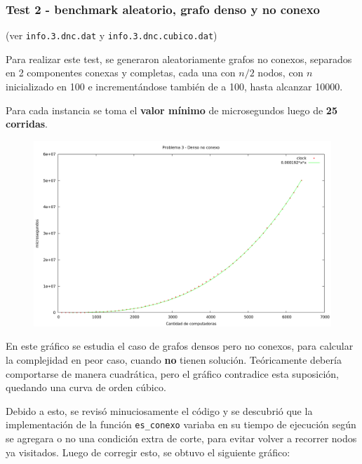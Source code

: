 \newpage
\subsubsection{Test 2 - benchmark aleatorio, grafo denso y no conexo}

(ver \verb|info.3.dnc.dat| y \verb|info.3.dnc.cubico.dat|) \medskip

Para realizar este test, se generaron aleatoriamente grafos no conexos, separados en 2 componentes conexas y completas, cada una con $n/2$ nodos, con  $n$ inicializado en 100 e incrementándose también de a 100, hasta alcanzar 10000.

Para cada instancia se toma el \textbf{valor mínimo} de microsegundos luego de
\textbf{25 corridas}.

\vspace*{0.5cm}

\begin{figure}[h]
  \begin{center}
    \includegraphics[scale=0.35]{imagenes/grafico-3-dnc-cubico.png}
  \end{center}
\end{figure}

\vspace*{0.5cm}

En este gráfico se estudia el caso de grafos densos pero no conexos,
para calcular la complejidad en peor caso, cuando \textbf{no} tienen solución.
Teóricamente debería comportarse de manera cuadrática, pero el gráfico contradice esta suposición, quedando una curva de orden cúbico.

\newpage
Debido a esto, se revisó minuciosamente el código y se descubrió que la implementación de la función \verb|es_conexo| variaba en su tiempo de ejecución según se agregara o no una condición extra de corte, para evitar volver a recorrer nodos ya visitados. Luego de corregir esto, se obtuvo el siguiente gráfico:


